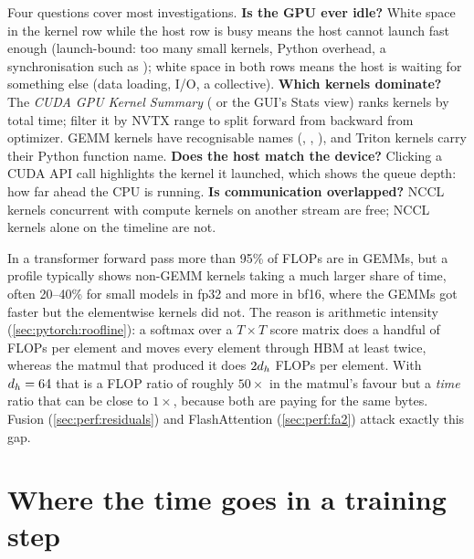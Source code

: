 Four questions cover most investigations. \textbf{Is the GPU ever idle?} White space in the
kernel row while the host row is busy means the host cannot launch fast enough (launch-bound:
too many small kernels, Python overhead, a synchronisation such as ); white space in
both rows means the host is waiting for something else (data loading, I/O, a collective).
\textbf{Which kernels dominate?} The \emph{CUDA GPU Kernel Summary} ( or the GUI's
Stats view) ranks kernels by total time; filter it by NVTX range to split forward from backward
from optimizer. GEMM kernels have recognisable names (,
, ), and Triton kernels carry their Python
function name. \textbf{Does the host match the device?} Clicking a CUDA API call highlights the
kernel it launched, which shows the queue depth: how far ahead the CPU is running. \textbf{Is
communication overlapped?} NCCL kernels concurrent with compute kernels on another stream are
free; NCCL kernels alone on the timeline are not.

\begin{systemslens}
In a transformer forward pass more than 95\% of FLOPs are in GEMMs, but a profile typically shows
non-GEMM kernels taking a much larger share of time, often 20--40\% for small models in fp32 and more
in bf16, where the GEMMs got faster but the elementwise kernels did not. The reason is arithmetic
intensity (\cref{sec:pytorch:roofline}): a softmax over a $T\times T$ score matrix does a handful of
FLOPs per element and moves every element through HBM at least twice, whereas the matmul that
produced it does $2d_{h}$ FLOPs per element. With $d_{h}=64$ that is a FLOP ratio of roughly
$50\times$ in the matmul's favour but a \emph{time} ratio that can be close to $1\times$, because both
are paying for the same bytes. Fusion (\cref{sec:perf:residuals}) and FlashAttention
(\cref{sec:perf:fa2}) attack exactly this gap.
\end{systemslens}

\section{Where the time goes in a training step}\label{sec:perf:anatomy}

